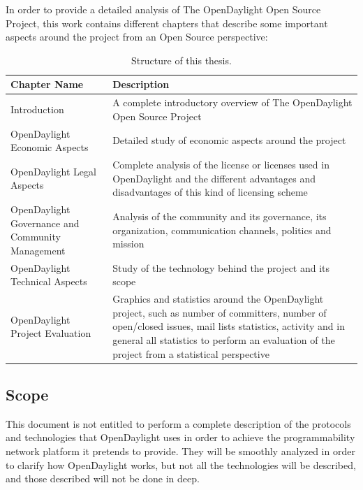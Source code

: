 \documentclass[a4paper, 12pt]{book}
\begin{document}
In order to provide a detailed analysis of The OpenDaylight Open Source Project, this work contains different chapters that describe some important aspects around the project from an Open Source perspective:

\begin{table}[H]
\footnotesize
\begin{center}
\begin{tabular}{|p{5cm}|p{10cm}|}
\hline
\textbf{Chapter Name} & \textbf{Description} \\ \hline \hline
Introduction & A complete introductory overview of The OpenDaylight Open Source Project \\
\hline
OpenDaylight Economic Aspects & Detailed study of economic aspects around the project \\
\hline
OpenDaylight Legal Aspects & Complete analysis of the license or licenses used in OpenDaylight and the different advantages and disadvantages of this kind of licensing scheme \\
\hline
OpenDaylight Governance and Community Management & Analysis of the community and its governance, its organization, communication channels, politics and mission \\
\hline
OpenDaylight Technical Aspects & Study of the technology behind the project and its scope \\
\hline
OpenDaylight Project Evaluation & Graphics and statistics around the OpenDaylight project, such as number of committers, number of open/closed issues, mail lists statistics, activity and in general all statistics to perform an evaluation of the project from a statistical perspective \\
\hline
\end{tabular}
\end{center}
\caption{Structure of this thesis.}
\label{tab:documentstructure}
\end{table}

\subsection{Scope}
\label{subsec:scope}

This document is not entitled to perform a complete description of the protocols and technologies that OpenDaylight uses in order to achieve the programmability network platform it pretends to provide. They will be smoothly analyzed in order to clarify how OpenDaylight works, but not all  the technologies will be described, and those described will not be done in deep.
\end{document}
